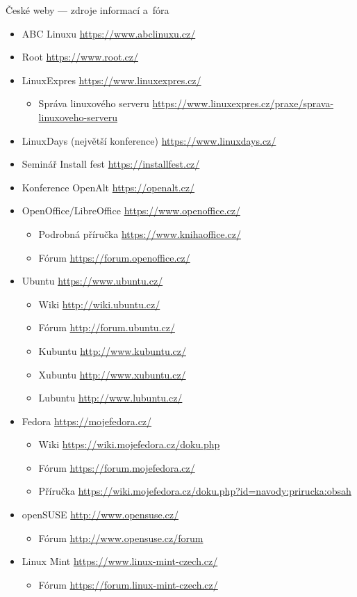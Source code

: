 \documentclass[compress, ucs, xelatex, 11pt, xcolor=svgnames,
  hyperref={
    bookmarks=true,
    unicode=true,
    colorlinks=true,
    pdftitle={Linux, command line and MetaCentrum},
    plainpages=false,
    pdfauthor={Vojtech Zeisek},
    pdfsubject={Course about use of Linux command line, writing shell scripts and using MetaCentrum of CESNET},
    pdfcreator={XeLaTeX},
    pdfkeywords={Linux, GNU, BASH, shell, command line, MetaCentrum},
    linkcolor=DarkRed,
    anchorcolor=DarkBlue,
    citecolor=Indigo,
    filecolor=NavyBlue,
    menucolor=DarkMagenta,
    urlcolor=DarkBlue,
    pdftex},
  url={hyphens, lowtilde} %
  ]{beamer}
\begin{document}
\begin{frame}[allowframebreaks]{České weby --- zdroje informací a~fóra}
  \begin{itemize}
    \item ABC Linuxu \url{https://www.abclinuxu.cz/}
    \item Root \url{https://www.root.cz/}
    \item LinuxExpres \url{https://www.linuxexpres.cz/}
    \begin{itemize}
      \item Správa linuxového serveru \url{https://www.linuxexpres.cz/praxe/sprava-linuxoveho-serveru}
    \end{itemize}
    \item LinuxDays (největší konference) \url{https://www.linuxdays.cz/}
    \item Seminář Install fest \url{https://installfest.cz/}
    \item Konference OpenAlt \url{https://openalt.cz/}
    \item OpenOffice/LibreOffice \url{https://www.openoffice.cz/}
    \begin{itemize}
      \item Podrobná příručka \url{https://www.knihaoffice.cz/}
      \item Fórum \url{https://forum.openoffice.cz/}
    \end{itemize}
    \item Ubuntu \url{https://www.ubuntu.cz/}
    \begin{itemize}
      \item Wiki \url{http://wiki.ubuntu.cz/}
      \item Fórum \url{http://forum.ubuntu.cz/}
      \item Kubuntu \url{http://www.kubuntu.cz/}
      \item Xubuntu \url{http://www.xubuntu.cz/}
      \item Lubuntu \url{http://www.lubuntu.cz/}
    \end{itemize}
    \item Fedora \url{https://mojefedora.cz/}
    \begin{itemize}
      \item Wiki \url{https://wiki.mojefedora.cz/doku.php}
      \item Fórum \url{https://forum.mojefedora.cz/}
      \item Příručka \url{https://wiki.mojefedora.cz/doku.php?id=navody:prirucka:obsah}
    \end{itemize}
    \item openSUSE \url{http://www.opensuse.cz/}
    \begin{itemize}
      \item Fórum \url{http://www.opensuse.cz/forum}
    \end{itemize}
    \item Linux Mint \url{https://www.linux-mint-czech.cz/}
    \begin{itemize}
      \item Fórum \url{https://forum.linux-mint-czech.cz/}
    \end{itemize}
  \end{itemize}
\end{frame}
\end{document}
